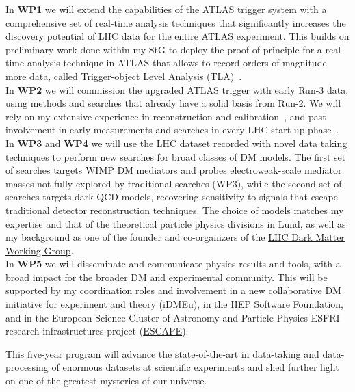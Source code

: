 In \textbf{WP1} we will extend the capabilities of the ATLAS trigger system with a comprehensive set of real-time analysis techniques that significantly increases the discovery potential of LHC data for the entire ATLAS experiment. This builds on preliminary work done within my StG to deploy the proof-of-principle for a real-time analysis technique in ATLAS that allows to record orders of magnitude more data, called Trigger-object Level Analysis (TLA)~\cite{Aaboud:2018fzt}. \\
In \textbf{WP2} we will commission the upgraded ATLAS trigger with early Run-3 data, using methods and searches that already have a solid basis from Run-2. We will rely on my extensive experience in reconstruction and calibration~\cite{Aad:2014bia,Aaboud:2018kfi}, and past involvement in early measurements and searches in every LHC start-up phase~\cite{Doglioni:2011ema,Aad:2014aqa,ATLAS:2015nsi}. \\ %
In \textbf{WP3} and \textbf{WP4} we will use the LHC dataset recorded with novel data taking techniques to perform new searches for broad classes of DM models. The first set of searches targets WIMP DM mediators and probes electroweak-scale mediator masses not fully explored by traditional searches (WP3), while the second set of searches targets dark QCD models, recovering sensitivity to signals that escape traditional detector reconstruction techniques. The choice of models matches my expertise and that of the theoretical particle physics divisions in Lund, as well as my background as one of the founder and co-organizers of the \href{https://lpcc.web.cern.ch/content/lhc-dm-wg-wg-dark-matter-searches-lhc}{LHC Dark Matter Working Group}. \\
In \textbf{WP5} we will disseminate and communicate physics results and tools, with a broad impact for the broader DM and experimental community. This will be supported by my coordination roles and involvement in a new collaborative DM initiative for experiment and theory (\href{https://indico.cern.ch/e/idmeu}{iDMEu}), in the \href{https://hepsoftwarefoundation.org}{HEP Software Foundation}, and in the European Science Cluster of Astronomy and Particle Physics ESFRI research infrastructures project (\href{https://projectescape.eu}{ESCAPE}). 

This five-year program will advance the state-of-the-art in data-taking and data-processing of enormous datasets at scientific experiments and shed further light on one of the greatest mysteries of our universe. 
